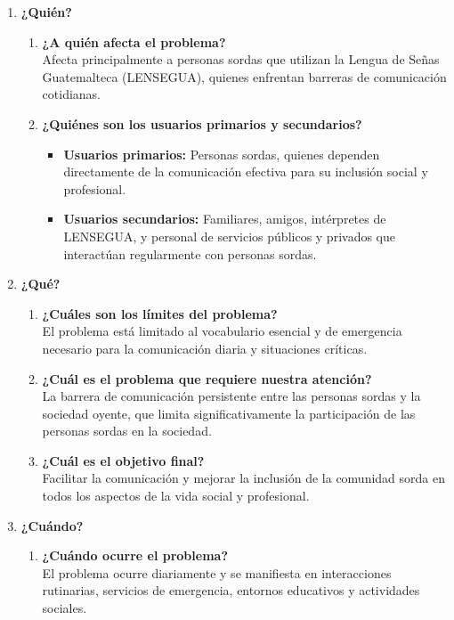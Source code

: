 \begin{enumerate}
    \item \textbf{¿Quién?}
    \begin{enumerate}
        \item \textbf{¿A quién afecta el problema?} \\
        Afecta principalmente a personas sordas que utilizan la Lengua de Señas Guatemalteca (LENSEGUA), quienes enfrentan barreras de comunicación cotidianas.
        \item \textbf{¿Quiénes son los usuarios primarios y secundarios?}
        \begin{itemize}
            \item \textbf{Usuarios primarios:} Personas sordas, quienes dependen directamente de la comunicación efectiva para su inclusión social y profesional.
            \item \textbf{Usuarios secundarios:} Familiares, amigos, intérpretes de LENSEGUA, y personal de servicios públicos y privados que interactúan regularmente con personas sordas.
        \end{itemize}
    \end{enumerate}

    \item \textbf{¿Qué?}
    \begin{enumerate}
        \item \textbf{¿Cuáles son los límites del problema?} \\
        El problema está limitado al vocabulario esencial y de emergencia necesario para la comunicación diaria y situaciones críticas.
        \item \textbf{¿Cuál es el problema que requiere nuestra atención?} \\
        La barrera de comunicación persistente entre las personas sordas y la sociedad oyente, que limita significativamente la participación de las personas sordas en la sociedad.
        \item \textbf{¿Cuál es el objetivo final?} \\
        Facilitar la comunicación y mejorar la inclusión de la comunidad sorda en todos los aspectos de la vida social y profesional.
    \end{enumerate}

    \item \textbf{¿Cuándo?}
    \begin{enumerate}
        \item \textbf{¿Cuándo ocurre el problema?} \\
        El problema ocurre diariamente y se manifiesta en interacciones rutinarias, servicios de emergencia, entornos educativos y actividades sociales.
    \end{enumerate}


\end{enumerate}
